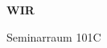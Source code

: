 \documentclass[a4paper]{article}
\begin{document}
\printGenericVSLHeader
\begin{center}
\begin{vsltext}{3cm}{4cm}

   \vspace{0.5cm} 

    \textbf{WIR} 

    \vspace{1.5cm}

    Seminarraum 101C

\end{vsltext}

\end{center}
\end{document}
